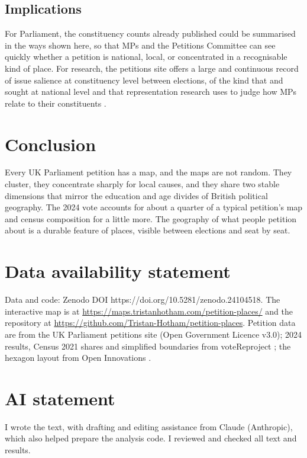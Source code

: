 \documentclass[11pt,a4paper]{article}
\begin{document}
\subsection{Implications}
For Parliament, the constituency counts already published could be summarised in the ways shown here, so that MPs and the Petitions Committee can see quickly whether a petition is national, local, or concentrated in a recognisable kind of place. For research, the petitions site offers a large and continuous record of issue salience at constituency level between elections, of the kind that \citet{jonesbaumgartner2005} and \citet{sorokawlezien2010} sought at national level and that representation research uses to judge how MPs relate to their constituents \citep{hanretty2017}.

\section{Conclusion}\label{sec:conc}
Every UK Parliament petition has a map, and the maps are not random. They cluster, they concentrate sharply for local causes, and they share two stable dimensions that mirror the education and age divides of British political geography. The 2024 vote accounts for about a quarter of a typical petition's map and census composition for a little more. The geography of what people petition about is a durable feature of places, visible between elections and seat by seat.

\section*{Data availability statement}
Data and code: Zenodo DOI https://doi.org/10.5281/zenodo.24104518. The interactive map is at \url{https://maps.tristanhotham.com/petition-places/} and the repository at \url{https://github.com/Tristan-Hotham/petition-places}. Petition data are from the UK Parliament petitions site (Open Government Licence v3.0); 2024 results, Census 2021 shares and simplified boundaries from voteReproject \citep{horan2025}; the hexagon layout from Open Innovations \citep{openinnovations2023}.

\section*{AI statement}
I wrote the text, with drafting and editing assistance from Claude (Anthropic), which also helped prepare the analysis code. I reviewed and checked all text and results.
\end{document}
